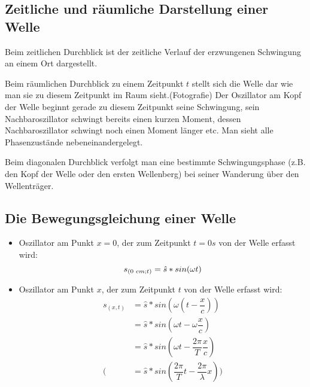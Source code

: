 \documentclass[12 pt]{article}
\numberwithin{equation}{section}
\begin{document}
	\subsection{Zeitliche und räumliche Darstellung einer Welle}

	
	Beim zeitlichen Durchblick ist der zeitliche Verlauf der erzwungenen Schwingung an einem Ort dargestellt.
	
	Beim räumlichen Durchblick zu einem Zeitpunkt $t$ stellt sich die Welle dar wie man sie zu diesem Zeitpunkt im Raum sieht.(Fotografie)
	Der Oszillator am Kopf der Welle beginnt gerade zu diesem Zeitpunkt seine Schwingung, sein Nachbaroszillator schwingt bereits einen kurzen Moment, dessen Nachbaroszillator schwingt noch einen Moment länger etc. Man sieht alle Phasenzustände nebeneinandergelegt. 
	
	Beim diagonalen Durchblick verfolgt man eine bestimmte Schwingungsphase (z.B. den Kopf der Welle oder den ersten Wellenberg) bei seiner Wanderung über den Wellenträger.
	
	\subsection{Die Bewegungsgleichung einer Welle}
	
	\begin{itemize}
		\item Oszillator am Punkt $x=0$, der zum Zeitpunkt $t=0s$ von der Welle erfasst wird:
		\begin{equation}
			s_{(0\hspace{1mm}cm;t)}=\hat{s}*sin(\omega t)
		\end{equation}
		\item Oszillator am Punkt $x$, der zum Zeitpunkt $t$ von der Welle erfasst wird:
		\begin{align}
			s_{(x,t)}&=\hat{s}*sin(\omega(t-\dfrac{x}{c}))\\
			&=\hat{s}*sin(\omega t-\omega\dfrac{x}{c})\\
			&=\hat{s}*sin(\omega t-\dfrac{2\pi}{T}\dfrac{x}{c})\\
			(&=\hat{s}*sin(\dfrac{2\pi}{T}t-\dfrac{2\pi}{\lambda}x))		
		\end{align}
	\end{itemize}
\end{document}
